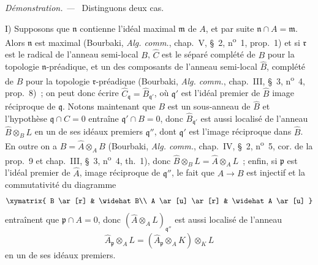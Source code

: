 \documentclass[10pt,oneside]{book}
\newcommand{\oldpage}[2][]{%
  \setcounter{footnote}{0}%
  \marginpar{\scriptsize\textbf{#1}~|~#2}\ignorespaces}
\newenvironment{proof}{%
  \par\medskip\noindent\textit{Démonstration. ---\ }}{\par}
\begin{document}
\begin{proof}
Distinguons deux cas.

I) Supposons que $\mathfrak n$ contienne l'idéal maximal $\mathfrak m$ de
$A$, et par suite $\mathfrak n\cap A=\mathfrak m$. Alors $\mathfrak n$ est
maximal (Bourbaki, \emph{Alg. comm.}, chap.~V, §~2,
n\textsuperscript{o}~1, prop.~1) et si $\mathfrak r$ est le radical de
l'anneau semi-local $B$, $\widehat C$ est le séparé complété de $B$ pour la
topologie $\mathfrak n$-préadique, et un des composants de l'anneau
semi-local $\widehat B$, complété de $B$ pour la topologie
$\mathfrak r$-préadique (Bourbaki, \emph{Alg. comm.}, chap.~III, §~3,
n\textsuperscript{o}~4, prop.~8)~; on peut donc écrire
$\widehat C_\mathfrak q=\widehat B_{\mathfrak q'}$, où $\mathfrak q'$ est
l'idéal premier de $\widehat B$ image réciproque de $\mathfrak q$. Notons
maintenant que $B$ est un sous-anneau de $\widehat B$ et l'hypothèse
$\mathfrak q\cap C=0$ entraîne $\mathfrak q'\cap B=0$, donc
$\widehat B_{\mathfrak q'}$ est aussi localisé de l'anneau
$\widehat B\otimes_B L$ en un de ses idéaux premiers $\mathfrak q''$, dont
$\mathfrak q'$ est l'image réciproque dans $\widehat B$. En outre on a
$\widehat B=\widehat A\otimes_A B$ (Bourbaki, \emph{Alg. comm.}, chap.~IV,
§~2, n\textsuperscript{o}~5, cor. de la prop.~9 et chap.~III, §~3,
n\textsuperscript{o}~4, th.~1), donc
$\widehat B\otimes_B L=\widehat A\otimes_A L$~; enfin, si $\mathfrak p$ est
l'idéal premier de $\widehat A$, image réciproque de $\mathfrak q''$, le
fait que $A\to B$ est injectif et la commutativité du diagramme
\[
  \xymatrix{
    B \ar[r] & \widehat B\\
    A \ar[u] \ar[r] & \widehat A \ar[u]
  }
\]
entraînent que $\mathfrak p\cap A=0$, donc
$(\widehat A\otimes_A L)_{\mathfrak q''}$ est aussi localisé de l'anneau
\[
  \widehat A_\mathfrak p\otimes_A L
  =(\widehat A_\mathfrak p\otimes_A K)\otimes_K L
\]
en un de ses idéaux premiers.

\oldpage[0\textsubscript{IV-1}]{192}


\end{proof}
\end{document}
